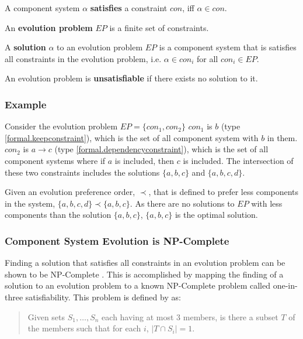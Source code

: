 \begin{defs}
\label{formal.constraintdefs}
A component system $\alpha$ \textbf{satisfies} a constraint $con$, iff $\alpha \in con$.
\end{defs}

\begin{defs}
An \textbf{evolution problem} $EP$ is a finite set of constraints.
\end{defs}

\begin{defs}
A \textbf{solution} $\alpha$ to an evolution problem $EP$ is a component system that is satisfies all constraints in the evolution problem, i.e. $\alpha \in con_i$ for all $con_i \in EP$.  
\end{defs}

\begin{defs}
An evolution problem is \textbf{unsatisfiable} if there exists no solution to it.  
\end{defs}


\subsubsection{Example}
Consider the evolution problem $EP = \{con_1,con_2\}$
$con_1$ is $b$ (type \ref{formal.keepconstraint}), which is the set of all component system with $b$ in them.
$con_2$ is $a \rightarrow c$ (type \ref{formal.dependencyconstraint}), which is the set of all component systems where if $a$ is included, then $c$ is included.
The intersection of these two constraints includes the solutions $\{a,b,c\}$ and $\{a,b,c,d\}$.

Given an evolution preference order, $\prec$, that is defined to prefer less components in the system, $\{a,b,c,d\} \prec \{a,b,c\}$.
As there are no solutions to $EP$ with less components than the solution $\{a,b,c\}$, $\{a,b,c\}$ is the optimal solution.

\subsubsection{Component System Evolution is NP-Complete}
Finding a solution that satisfies all constraints in an evolution problem can be shown to be NP-Complete \citep{cook1971}.
This is accomplished by mapping the finding of a solution to an evolution problem to a known NP-Complete problem called one-in-three satisfiability.
This problem is defined by \cite{Schaefer1978} as:
\begin{quote}
Given sets $S_1, \ldots, S_n$ each having at most 3 members, is there a subset $T$ of the members such that for each $i$, $|T \cap S_i|  =  1$.
\end{quote}

